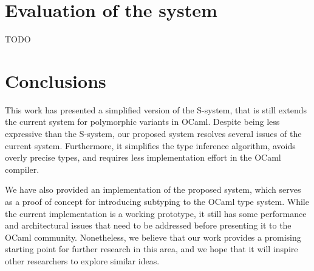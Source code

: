 \documentclass[a4paper,11pt,oneside]{article}
\theoremstyle{definition}
\newcommand{\mylastname}{Venediktov}
\newcommand{\myfirstname}{Roman}
\newcommand{\mynumber}{30007033}
\begin{document}
\section{Evaluation of the system}

TODO

\section{Conclusions}

This work has presented a simplified version of the S-system\cite{Castagna_2016},
that is still extends the current system for polymorphic variants in OCaml.
Despite being less expressive than the S-system, our proposed system resolves
several issues of the current system. Furthermore, it simplifies the type
inference algorithm, avoids overly precise types, and requires less
implementation effort in the OCaml compiler.

We have also provided an implementation of the proposed system, which serves
as a proof of concept for introducing subtyping to the OCaml type system.
While the current implementation is a working prototype, it still has some
performance and architectural issues that need to be addressed before
presenting it to the OCaml community. Nonetheless, we believe that our work
provides a promising starting point for further research in this area, and
we hope that it will inspire other researchers to explore similar ideas.

\newpage

\printbibliography

\newpage
\thispagestyle{empty}


\end{document}
